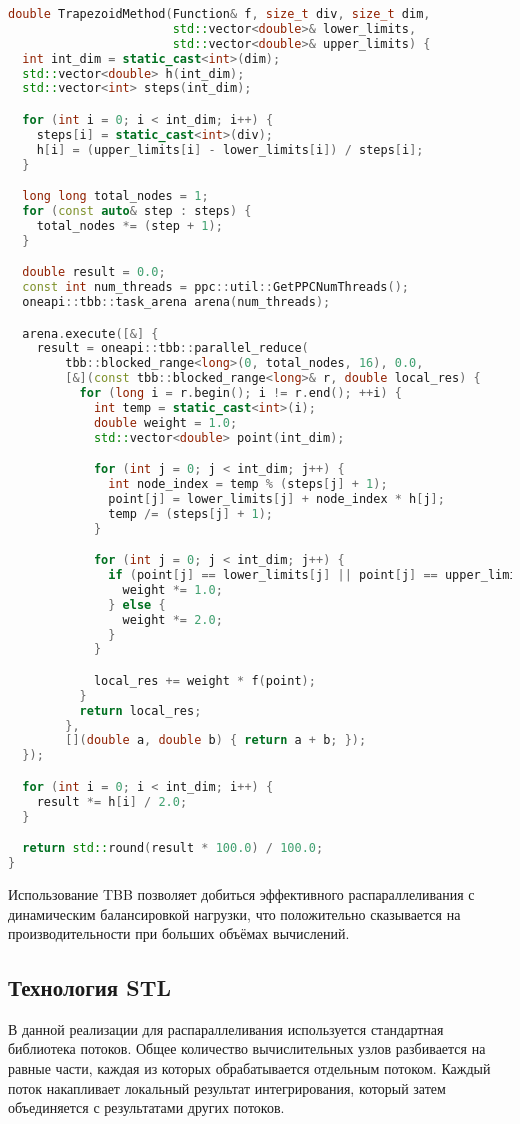 \documentclass[a4paper,14pt]{article}
\begin{document}
\begin{lstlisting}[language=C++]
double TrapezoidMethod(Function& f, size_t div, size_t dim,
                       std::vector<double>& lower_limits,
                       std::vector<double>& upper_limits) {
  int int_dim = static_cast<int>(dim);
  std::vector<double> h(int_dim);
  std::vector<int> steps(int_dim);

  for (int i = 0; i < int_dim; i++) {
    steps[i] = static_cast<int>(div);
    h[i] = (upper_limits[i] - lower_limits[i]) / steps[i];
  }

  long long total_nodes = 1;
  for (const auto& step : steps) {
    total_nodes *= (step + 1);
  }

  double result = 0.0;
  const int num_threads = ppc::util::GetPPCNumThreads();
  oneapi::tbb::task_arena arena(num_threads);

  arena.execute([&] {
    result = oneapi::tbb::parallel_reduce(
        tbb::blocked_range<long>(0, total_nodes, 16), 0.0,
        [&](const tbb::blocked_range<long>& r, double local_res) {
          for (long i = r.begin(); i != r.end(); ++i) {
            int temp = static_cast<int>(i);
            double weight = 1.0;
            std::vector<double> point(int_dim);

            for (int j = 0; j < int_dim; j++) {
              int node_index = temp % (steps[j] + 1);
              point[j] = lower_limits[j] + node_index * h[j];
              temp /= (steps[j] + 1);
            }

            for (int j = 0; j < int_dim; j++) {
              if (point[j] == lower_limits[j] || point[j] == upper_limits[j]) {
                weight *= 1.0;
              } else {
                weight *= 2.0;
              }
            }

            local_res += weight * f(point);
          }
          return local_res;
        },
        [](double a, double b) { return a + b; });
  });

  for (int i = 0; i < int_dim; i++) {
    result *= h[i] / 2.0;
  }

  return std::round(result * 100.0) / 100.0;
}
\end{lstlisting}

Использование TBB позволяет добиться эффективного распараллеливания с динамическим балансировкой нагрузки, что положительно сказывается на производительности при больших объёмах вычислений.

\subsection{Технология STL}
В данной реализации для распараллеливания используется стандартная библиотека потоков. Общее количество вычислительных узлов разбивается на равные части, каждая из которых обрабатывается отдельным потоком. Каждый поток накапливает локальный результат интегрирования, который затем объединяется с результатами других потоков.
\end{document}
